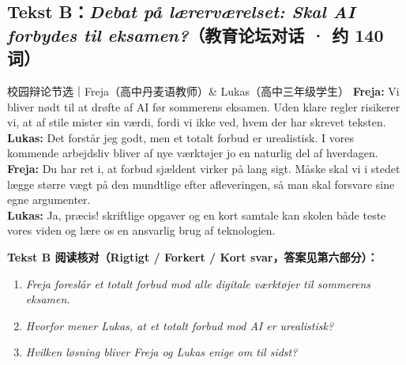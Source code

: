 \subsection*{Tekst B：\textit{Debat på lærerværelset: Skal AI forbydes til eksamen?}（教育论坛对话 · 约 140 词）}

\begin{emailbox}{校园辩论节选｜Freja（高中丹麦语教师）\& Lukas（高中三年级学生）}
\textbf{Freja:} Vi bliver nødt til at drøfte  af AI før sommerens eksamen. Uden klare regler risikerer vi, at  af stile mister sin værdi, fordi vi ikke ved, hvem der har skrevet teksten.\\
\textbf{Lukas:} Det forstår jeg godt, men et totalt forbud er urealistisk. I vores kommende arbejdsliv bliver  af nye værktøjer jo en naturlig del af hverdagen.\\
\textbf{Freja:} Du har ret i, at forbud sjældent virker på lang sigt. Måske skal vi i stedet lægge større vægt på den mundtlige  efter afleveringen, så man skal forsvare sine egne argumenter.\\
\textbf{Lukas:} Ja, præcis!  skriftlige opgaver og en kort samtale kan skolen både teste vores viden og lære os en ansvarlig brug af teknologien.
\end{emailbox}

\textbf{Tekst B 阅读核对（Rigtigt / Forkert / Kort svar，答案见第六部分）：}
\begin{enumerate}
  \item \textit{Freja foreslår et totalt forbud mod alle digitale værktøjer til sommerens eksamen.} \underline{\hspace{2.2cm}}
  \item \textit{Hvorfor mener Lukas, at et totalt forbud mod AI er urealistisk?} \underline{\hspace{2.2cm}}
  \item \textit{Hvilken løsning bliver Freja og Lukas enige om til sidst?} \underline{\hspace{2.2cm}}
\end{enumerate}

